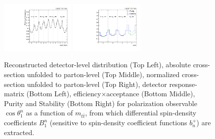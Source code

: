 \begin{figure}[htb]
\begin{center}
 \includegraphics[width=0.32\textwidth]{fig_fullRun2UL/unfolding/combined/TotEff_b1n_mttbar.pdf}
 \includegraphics[width=0.32\textwidth]{fig_fullRun2UL/unfolding/combined/PurStab_b1n_mttbar.pdf} \\
\caption{Reconstructed detector-level distribution (Top Left), absolute cross-section unfolded to parton-level (Top Middle), normalized cross-section unfolded to parton-level (Top Right), detector response-matrix (Bottom Left), efficiency$\times$acceptance (Bottom Middle), Purity and Stability (Bottom Right) for polarization observable $\cos\theta_{1}^{n}$ as a function of $m_{t\bar{t}}$, from which differential spin-density coefficients $B_{1}^{n}$ (sensitive to spin-density coefficient functions $b_n^{+}$) are extracted.}
\label{fig:b1n_mttbar}
\end{center}
\end{figure}
\clearpage
